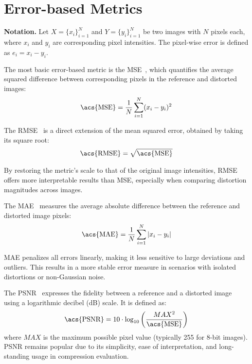\section{Error-based Metrics}\label{app:sec:error_based_metrics}

\noindent \textbf{Notation.}  
Let $X = \{x_i\}_{i=1}^N$ and $Y = \{y_i\}_{i=1}^N$ be two images with $N$ pixels each, where $x_i$ and $y_i$ are corresponding pixel intensities. The pixel-wise error is defined as $e_i = x_i - y_i$.

The most basic error-based metric is the \acf{MSE}~\cite{wang2004image}, which quantifies the average squared difference between corresponding pixels in the reference and distorted images:
\begin{equation}
\text{\acs{MSE}} = \frac{1}{N} \sum_{i=1}^{N} (x_i - y_i)^2
\end{equation}

The \acf{RMSE}~\cite{wang2004image} is a direct extension of the mean squared error, obtained by taking its square root:
\begin{equation}
\text{\acs{RMSE}} = \sqrt{\text{\acs{MSE}}}
\end{equation}

By restoring the metric's scale to that of the original image intensities, \acs{RMSE} offers more interpretable results than \acs{MSE}, especially when comparing distortion magnitudes across images.

The \acf{MAE}~\cite{wang2004image} measures the average absolute difference between the reference and distorted image pixels:
\begin{equation}
\text{\acs{MAE}} = \frac{1}{N} \sum_{i=1}^{N} |x_i - y_i|
\end{equation}

\acs{MAE} penalizes all errors linearly, making it less sensitive to large deviations and outliers. This results in a more stable error measure in scenarios with isolated distortions or non-Gaussian noise.

The \acf{PSNR}~\cite{wang2004image} expresses the fidelity between a reference and a distorted image using a logarithmic decibel (dB) scale. It is defined as:
\begin{equation}
\text{\acs{PSNR}} = 10 \cdot \log_{10} \left( \frac{MAX^2}{\text{\acs{MSE}}} \right)
\end{equation}
where $MAX$ is the maximum possible pixel value (typically 255 for 8-bit images). \acs{PSNR} remains popular due to its simplicity, ease of interpretation, and long-standing usage in compression evaluation.

